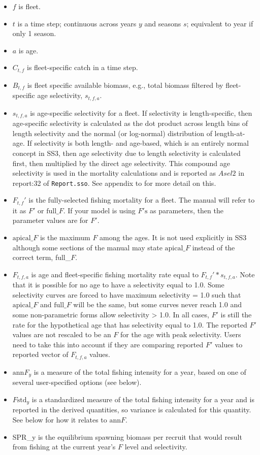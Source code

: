 \begin{itemize}
	\item $f$ is fleet.
	\item $t$ is a time step; continuous across years $y$ and seasons $s$; equivalent to year if only 1 season.
	\item $a$ is age.
	\item $C_{t,f}$ is fleet-specific catch in a time step.
	\item $B_{t,f}$ is fleet specific available biomass, e.g., total biomass filtered by fleet-specific age selectivity, $s_{t,f,a}$.
	\item $s_{t,f,a}$ is age-specific selectivity for a fleet. If selectivity is length-specific, then age-specific selectivity is calculated as the dot product across length bins of length selectivity and the normal (or log-normal) distribution of length-at-age. If selectivity is both length- and age-based, which is an entirely normal concept in SS3, then age selectivity due to length selectivity is calculated first, then multiplied by the direct age selectivity. This compound age selectivity is used in the mortality calculations and is reported as $Asel2$ in report:32 of \texttt{Report.sso}. See appendix to \citet{methotstock2013} for more detail on this.
	\item $F_{t,f}'$ is the fully-selected fishing mortality for a fleet. The manual will refer to it as $F'$ or $\text{full\_}F$. If your model is using $F'\text{s}$ as parameters, then the parameter values are for $F'$.
	\item $\text{apical\_}F$ is the maximum $F$ among the ages. It is not used explicitly in SS3 although some sections of the manual may state $\text{apical\_}F$ instead of the correct term, full\_$F$.
	\item $F_{t,f,a}$ is age and fleet-specific fishing mortality rate equal to $F_{t,f}' * s_{t,f,a}$. Note that it is possible for no age to have a selectivity equal to 1.0. Some selectivity curves are forced to have maximum selectivity = 1.0 such that $\text{apical\_}F$ and $\text{full\_}F$ will be the same, but some curves never reach 1.0 and some non-parametric forms allow selectivity > 1.0. In all cases, $F'$ is still the rate for the hypothetical age that has selectivity equal to 1.0. The reported $F'$ values are not rescaled to be an $F$ for the age with peak selectivity. Users need to take this into account if they are comparing reported $F'$ values to reported vector of $F_{t,f,a}$ values.
	\item $\text{ann}F_y$ is a measure of the total fishing intensity for a year, based on one of several user-specified options (see below).
	\item $F\text{std}_y$ is a standardized measure of the total fishing intensity for a year and is reported in the derived quantities, so variance is calculated for this quantity. See below for how it relates to $\text{ann}F$.
	\item SPR\_y is the equilibrium spawning biomass per recruit that would result from fishing at the current year’s $F$ level and selectivity.
\end{itemize}

